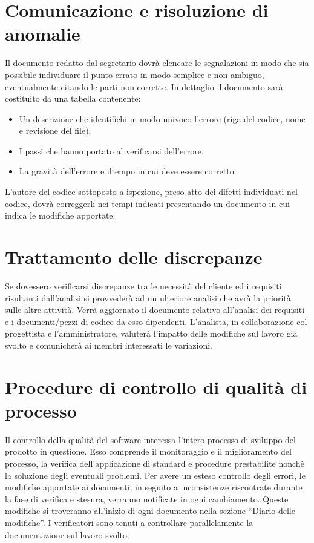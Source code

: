 \documentclass[11pt,titlepage,a4paper]{report}
\begin{document}
\section{Comunicazione e risoluzione di anomalie}
Il documento redatto dal segretario dovr\`a elencare le segnalazioni in modo che sia possibile individuare il punto errato in modo semplice e non ambiguo, eventualmente citando le parti non corrette. In dettaglio il documento sar\`a costituito da una tabella contenente:
\begin{itemize}
\item Un descrizione che identifichi in modo univoco l'errore (riga del codice, nome e revisione del file).
\item I passi che hanno portato al verificarsi dell'errore.
\item La gravit\`a dell'errore e iltempo in cui deve essere corretto.
\end{itemize}
L'autore del codice sottoposto a ispezione, preso atto dei difetti individuati nel codice, dovr\`a correggerli nei tempi indicati presentando un documento in cui indica le modifiche apportate.

\section{Trattamento delle discrepanze} 
Se dovessero verificarsi discrepanze tra le necessit\`a del cliente ed i requisiti risultanti dall'analisi si provveder\`a ad un ulteriore analisi che avr\`a la priorit\`a sulle altre attivit\`a. Verr\`a aggiornato il documento relativo all'analisi dei requisiti e  i documenti/pezzi di codice da esso dipendenti. L'analista, in collaborazione col progettista e l'amministratore, valuter\`a l'impatto delle modifiche sul lavoro gi\`a svolto e comunicher\`a ai membri interessati le variazioni.

\section{Procedure di controllo di qualit\`a di processo}
Il controllo della qualit\`a del software interessa l'intero processo di sviluppo del prodotto in questione. Esso comprende il monitoraggio e il miglioramento del processo, la verifica dell'applicazione di standard e procedure prestabilite nonch\`e la soluzione degli eventuali problemi.
Per avere un esteso controllo degli errori, le modifiche apportate ai documenti, in seguito a inconsistenze riscontrate durante la fase di verifica e stesura, verranno notificate in ogni cambiamento. Queste modifiche si troveranno all'inizio di ogni documento nella sezione ``Diario delle modifiche''. I verificatori sono tenuti a controllare parallelamente la documentazione sul lavoro svolto.
\end{document}
